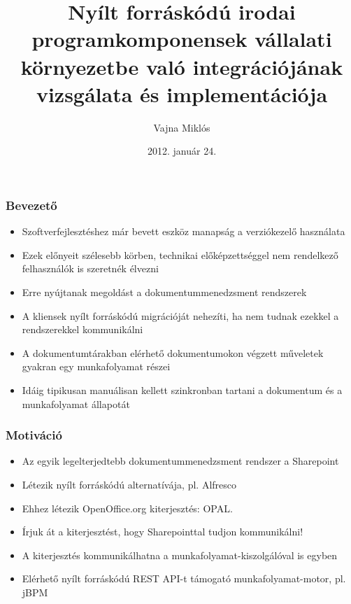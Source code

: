 \documentclass{beamer}
\author{Vajna Mikl\'{o}s}
\begin{document}
\title{Nyílt forráskódú irodai programkomponensek vállalati környezetbe való integrációjának vizsgálata és implementációja}
\date{2012. január 24.}

\frame{\titlepage}

\begin{frame}
\frametitle{Bevezető}
\begin{itemize}
\item Szoftverfejlesztéshez már bevett eszköz manapság a verziókezelő használata
\item Ezek előnyeit szélesebb körben, technikai előképzettséggel nem rendelkező felhasználók is szeretnék élvezni
\item Erre nyújtanak megoldást a dokumentummenedzsment rendszerek
\item A kliensek nyílt forráskódú migrációját nehezíti, ha nem tudnak ezekkel a rendszerekkel kommunikálni
\item A dokumentumtárakban elérhető dokumentumokon végzett műveletek gyakran egy munkafolyamat részei
\item Idáig tipikusan manuálisan kellett szinkronban tartani a dokumentum és a munkafolyamat állapotát
\end{itemize}
\end{frame}

\begin{frame}
\frametitle{Motiváció}
\begin{itemize}
\item Az egyik legelterjedtebb dokumentummenedzsment rendszer a Sharepoint
\item Létezik nyílt forráskódú alternatívája, pl. Alfresco
\item Ehhez létezik OpenOffice.org kiterjesztés: OPAL.
\item Írjuk át a kiterjesztést, hogy Sharepointtal tudjon kommunikálni!
\item A kiterjesztés kommunikálhatna a munkafolyamat-kiszolgálóval is egyben
\item Elérhető nyílt forráskódú REST API-t támogató munkafolyamat-motor, pl. jBPM
\end{itemize}
\end{frame}
\end{document}
